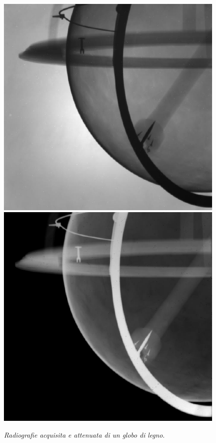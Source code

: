 \begin{figure}[htp]
\centering
\includegraphics[scale=0.58]{Immagini/globo1.png}\quad\includegraphics[scale=0.577]{Immagini/globo2.png}
\caption{\label{fig:globo} \textit{Radiografie acquisita e attenuata di un globo di legno}.}
\end{figure}

